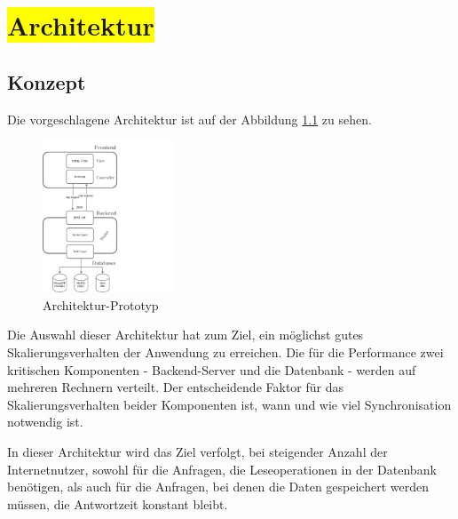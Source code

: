 \chapter{\colorbox{yellow}{Architektur}}

\section{Konzept}

Die vorgeschlagene Architektur ist auf der Abbildung \ref{img:architectureMyApp} zu sehen.

\begin{figure}[H]
\centering
\includegraphics[trim = 0mm 0mm 0mm 0mm, clip, width=0.35\textwidth]{resources/architectureMyAppWithoutFrameworks}
\caption[Architektur-Prototyp]{Architektur-Prototyp}
\label{img:architectureMyApp}
\end{figure}

Die Auswahl dieser Architektur hat zum Ziel, ein möglichst gutes Skalierungsverhalten der Anwendung zu erreichen. Die für die Performance zwei kritischen Komponenten - Backend-Server und die Datenbank - werden auf mehreren Rechnern verteilt. Der entscheidende Faktor für das Skalierungsverhalten beider Komponenten ist, wann und wie viel Synchronisation notwendig ist. 

In dieser Architektur wird das Ziel verfolgt, bei steigender Anzahl der Internetnutzer, sowohl für die Anfragen, die Leseoperationen in der Datenbank benötigen, als auch für die Anfragen, bei denen die Daten gespeichert werden müssen, die Antwortzeit konstant bleibt.

